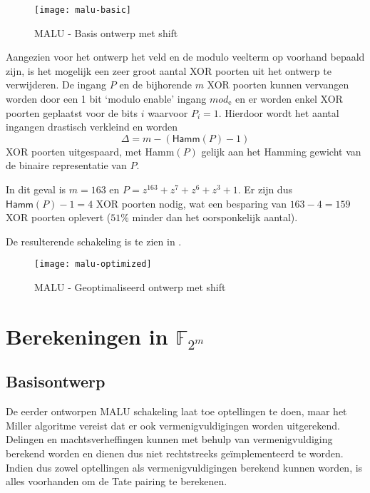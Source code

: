 \begin{figure}[h]
	\centering
		\texttt{[image: malu-basic]}
		\caption{MALU - Basis ontwerp met shift\label{figuur-implementatie-malu-basic}}
\end{figure}

Aangezien voor het ontwerp het veld en de modulo veelterm op voorhand bepaald zijn, is het mogelijk een zeer groot aantal XOR poorten uit het ontwerp te verwijderen. De ingang $P$ en de bijhorende $m$ XOR poorten kunnen vervangen worden door een 1 bit `modulo enable' ingang $mod_{\text{e}}$ en er worden enkel XOR poorten geplaatst voor de bits $i$ waarvoor $P_i = 1$. Hierdoor wordt het aantal ingangen drastisch verkleind en worden 
\[\Delta = m - (\textsf{Hamm}(P) - 1)\]
XOR poorten uitgespaard, met \textsf{Hamm}$(P)$ gelijk aan het Hamming gewicht van de binaire representatie van $P$.

In dit geval is $m = 163$ en $P = z^{163} + z^7 + z^6 + z^3 + 1$. Er zijn dus $\textsf{Hamm}(P) - 1 = 4$ XOR poorten nodig, wat een besparing van $163 - 4 =  159$ XOR poorten oplevert ($51\%$ minder dan het oorsponkelijk aantal).

De resulterende schakeling is te zien in .

\begin{figure}[h]
	\centering
		\texttt{[image: malu-optimized]}
		\caption{MALU - Geoptimaliseerd ontwerp met shift\label{figuur-implementatie-malu-optimized}}
\end{figure}

\section{Berekeningen in $\mathbb{F}_{2^m}$\label{sectie-implementatie-gf2m}}

\subsection{Basisontwerp\label{subsectie-implementatie-gf2m-basisontwerp}}

De eerder ontworpen MALU schakeling laat toe optellingen te doen, maar het Miller algoritme vereist dat er ook vermenigvuldigingen worden uitgerekend. Delingen en machtsverheffingen kunnen met behulp van vermenigvuldiging berekend worden en dienen dus niet rechtstreeks ge\"implementeerd te worden. Indien dus zowel optellingen als vermenigvuldigingen berekend kunnen worden, is alles voorhanden om de Tate pairing te berekenen.

